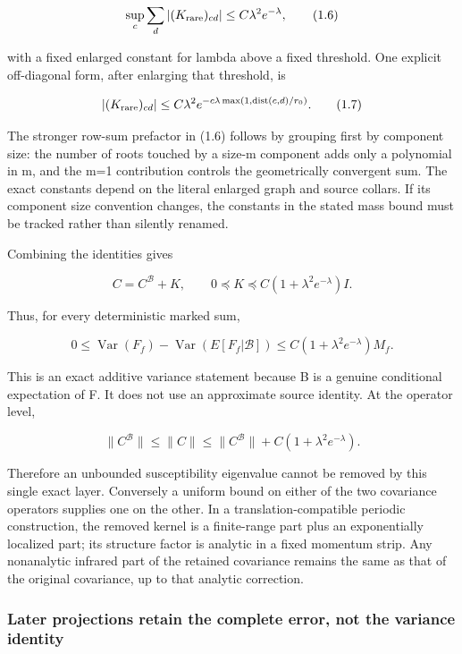 \documentclass[
  11pt,
]{article}
\begin{document}
\[
 \sup_c\sum_d |(K_{\rm rare})_{cd}|
 \le C\lambda^2e^{-\lambda},
\tag{1.6}
\]

with a fixed enlarged constant for lambda above a fixed threshold. One
explicit off-diagonal form, after enlarging that threshold, is

\[
 |(K_{\rm rare})_{cd}|
 \le C\lambda^2 e^{-c\lambda\max(1,\operatorname{dist}(c,d)/r_0)}.
\tag{1.7}
\]

The stronger row-sum prefactor in (1.6) follows by grouping first by
component size: the number of roots touched by a size-m component adds
only a polynomial in m, and the m=1 contribution controls the
geometrically convergent sum. The exact constants depend on the literal
enlarged graph and source collars. If its component size convention
changes, the constants in the stated mass bound must be tracked rather
than silently renamed.

Combining the identities gives

\[
 \boxed{\quad
 C=C^{\mathcal B}+K,\qquad
 0\preceq K\preceq C(1+\lambda^2e^{-\lambda})I.
 \quad}
\tag{1.8}
\]

Thus, for every deterministic marked sum,

\[
 0\le\operatorname{Var}(F_f)
       -\operatorname{Var}(E[F_f|\mathcal B])
 \le C(1+\lambda^2e^{-\lambda})M_f.
\tag{1.9}
\]

This is an exact additive variance statement because B is a genuine
conditional expectation of F. It does not use an approximate source
identity. At the operator level,

\[
 \|C^{\mathcal B}\|\le\|C\|
 \le\|C^{\mathcal B}\|+C(1+\lambda^2e^{-\lambda}).
\tag{1.10}
\]

Therefore an unbounded susceptibility eigenvalue cannot be removed by
this single exact layer. Conversely a uniform bound on either of the two
covariance operators supplies one on the other. In a
translation-compatible periodic construction, the removed kernel is a
finite-range part plus an exponentially localized part; its structure
factor is analytic in a fixed momentum strip. Any nonanalytic infrared
part of the retained covariance remains the same as that of the original
covariance, up to that analytic correction.

\hypertarget{later-projections-retain-the-complete-error-not-the-variance-identity}{%
\subsubsection{Later projections retain the complete error, not the
variance
identity}\label{later-projections-retain-the-complete-error-not-the-variance-identity}}
\end{document}
